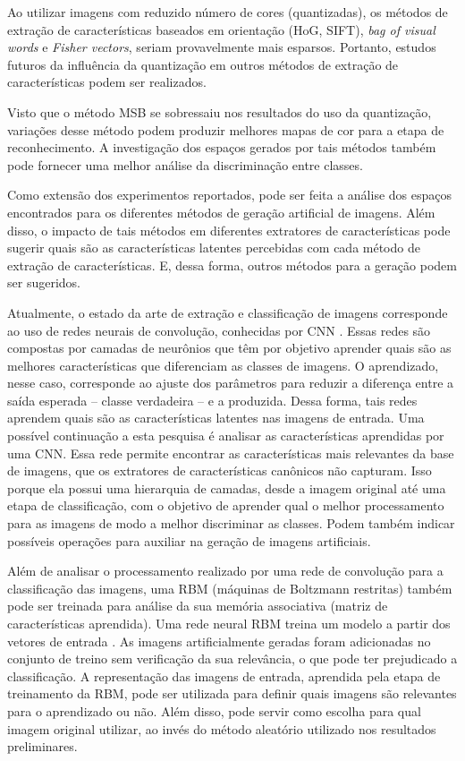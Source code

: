 Ao utilizar imagens com reduzido número de cores (quantizadas), os métodos de extração de características baseados em orientação (HoG, SIFT), \textit{bag of visual words} e \textit{Fisher vectors}, seriam provavelmente mais esparsos. Portanto, estudos futuros da influência da quantização em outros métodos de extração de características podem ser realizados.

Visto que o método MSB se sobressaiu nos resultados do uso da quantização, variações desse método podem produzir melhores mapas de cor para a etapa de reconhecimento. A investigação dos espaços gerados por tais métodos também pode fornecer uma melhor análise da discriminação entre classes.

Como extensão dos experimentos reportados, pode ser feita a análise dos espaços encontrados para os diferentes métodos de geração artificial de imagens. Além disso, o impacto de tais métodos em diferentes extratores de características pode sugerir quais são as características latentes percebidas com cada método de extração de características. E, dessa forma, outros métodos para a geração podem ser sugeridos.

Atualmente, o estado da arte de extração e classificação de imagens corresponde ao uso de redes neurais de convolução, conhecidas por CNN \cite{Schmidhuber2014}. Essas redes são compostas por camadas de neurônios que têm por objetivo aprender quais são as melhores características que diferenciam as classes de imagens. O aprendizado, nesse caso, corresponde ao ajuste dos parâmetros para reduzir a diferença entre a saída esperada -- classe verdadeira -- e a produzida. Dessa forma, tais redes aprendem quais são as características latentes nas imagens de entrada. Uma possível continuação a esta pesquisa é analisar as características aprendidas por uma CNN. Essa rede permite encontrar as características mais relevantes da base de imagens, que os extratores de características canônicos não capturam. Isso porque ela possui uma hierarquia de camadas, desde a imagem original até uma etapa de classificação, com o objetivo de aprender qual o melhor processamento para as imagens de modo a melhor discriminar as classes. Podem também indicar possíveis operações para auxiliar na geração de imagens artificiais.

Além de analisar o processamento realizado por uma rede de convolução para a classificação das imagens, uma RBM (máquinas de Boltzmann restritas) também pode ser treinada para análise da sua memória associativa (matriz de características aprendida). Uma rede neural RBM treina um modelo a partir dos vetores de entrada \cite{Fischer2014}. As imagens artificialmente geradas foram adicionadas no conjunto de treino sem verificação da sua relevância, o que pode ter prejudicado a classificação. A representação das imagens de entrada, aprendida pela etapa de treinamento da RBM, pode ser utilizada para definir quais imagens são relevantes para o aprendizado ou não. Além disso, pode servir como escolha para qual imagem original utilizar, ao invés do método aleatório utilizado nos resultados preliminares.
